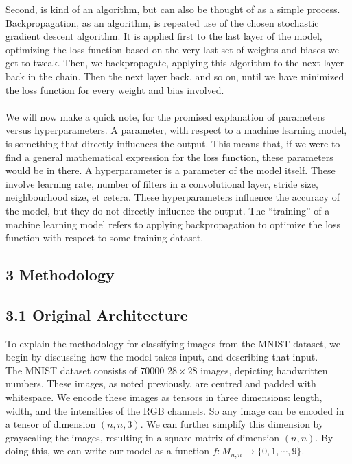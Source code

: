 \documentclass{article}
\begin{document}
Second, is kind of an algorithm, but can also be thought of as a simple process. Backpropagation, as an algorithm, is repeated use of the chosen stochastic gradient descent algorithm. It is applied first to the last layer of the model, optimizing the loss function based on the very last set of weights and biases we get to tweak. Then, we backpropagate, applying this algorithm to the next layer back in the chain. Then the next layer back, and so on, until we have minimized the loss function for every weight and bias involved.\\\\

We will now make a quick note, for the promised explanation of parameters versus hyperparameters. A parameter, with respect to a machine learning model, is something that directly influences the output. This means that, if we were to find a general mathematical expression for the loss function, these parameters would be in there. A hyperparameter is a parameter of the model itself. These involve learning rate, number of filters in a convolutional layer, stride size, neighbourhood size, et cetera. These hyperparameters influence the accuracy of the model, but they do not directly influence the output. The ``training'' of a machine learning model refers to applying backpropagation to optimize the loss function with respect to some training dataset.

\subsection*{3 Methodology}
\subsection*{3.1 Original Architecture}
To explain the methodology for classifying images from the MNIST dataset, we begin by discussing how the model takes input, and describing that input. \\

The MNIST dataset consists of $70000$ $28\times 28$ images, depicting handwritten numbers. These images, as noted previously, are centred and padded with whitespace. We encode these images as tensors in three dimensions: length, width, and the intensities of the RGB channels. So any image can be encoded in a tensor of dimension $(n, n, 3)$. We can further simplify this dimension by grayscaling the images, resulting in a square matrix of dimension $(n, n)$. By doing this, we can write our model as a function $f: M_{n,n} \rightarrow  \{0,1,\cdots,9\}$.\\
\end{document}

